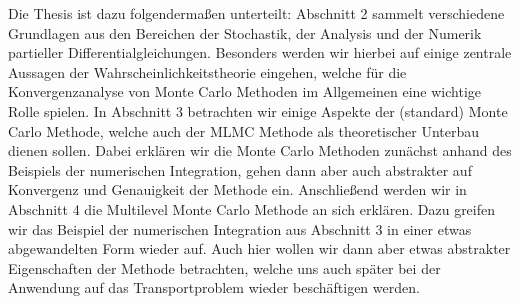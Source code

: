 Die Thesis ist dazu folgendermaßen unterteilt:\newline 
Abschnitt 2 sammelt verschiedene Grundlagen aus den Bereichen der Stochastik, der Analysis und der Numerik partieller Differentialgleichungen. Besonders werden wir hierbei auf einige zentrale Aussagen der Wahrscheinlichkeitstheorie eingehen, welche für die Konvergenzanalyse von Monte Carlo Methoden im Allgemeinen eine wichtige Rolle spielen. 
In Abschnitt 3 betrachten wir einige Aspekte der (standard) Monte Carlo Methode, welche auch der MLMC Methode als theoretischer Unterbau dienen sollen. Dabei erklären wir die Monte Carlo Methoden zunächst anhand des Beispiels der numerischen Integration, gehen dann aber auch abstrakter auf Konvergenz und Genauigkeit der Methode ein.  \newline
Anschließend werden wir in Abschnitt 4 die Multilevel Monte Carlo Methode an sich erklären.
Dazu greifen wir das Beispiel der numerischen Integration aus Abschnitt 3 in einer etwas abgewandelten Form wieder auf. Auch hier wollen wir dann aber etwas abstrakter Eigenschaften der Methode betrachten, welche uns auch später bei der Anwendung auf das Transportproblem wieder beschäftigen werden. \newline

